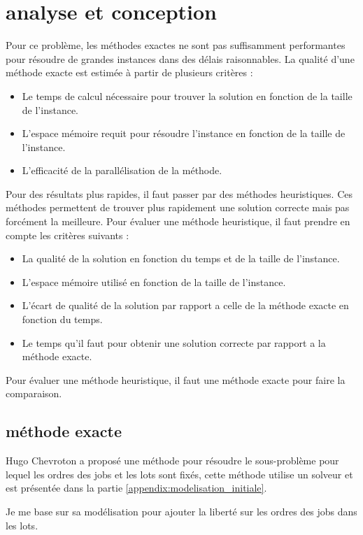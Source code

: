 \chapter{analyse et conception}

Pour ce problème, les méthodes exactes ne sont pas suffisamment performantes pour résoudre de grandes instances dans des délais raisonnables.
La qualité d'une méthode exacte est estimée à partir de plusieurs critères :
\begin{itemize}
	\item Le temps de calcul nécessaire pour trouver la solution en fonction de la taille de l'instance.
	\item L'espace mémoire requit pour résoudre l'instance en fonction de la taille de l'instance.
	\item L'efficacité de la parallélisation de la méthode.
\end{itemize}
Pour des résultats plus rapides, il faut passer par des méthodes heuristiques.
Ces méthodes permettent de trouver plus rapidement une solution correcte mais pas forcément la meilleure.
Pour évaluer une méthode heuristique, il faut prendre en compte les critères suivants :
\begin{itemize}
	\item La qualité de la solution en fonction du temps et de la taille de l'instance.
	\item L'espace mémoire utilisé en fonction de la taille de l'instance.
	\item L'écart de qualité de la solution par rapport a celle de la méthode exacte en fonction du temps.
	\item Le temps qu'il faut pour obtenir une solution correcte par rapport a la méthode exacte.
\end{itemize}
Pour évaluer une méthode heuristique, il faut une méthode exacte pour faire la comparaison.

\section{méthode exacte}
Hugo Chevroton a proposé une méthode pour résoudre le sous-problème pour lequel les ordres des jobs et les lots sont fixés,
cette méthode utilise un solveur et est présentée dans la partie \autoref{appendix:modelisation_initiale}.

Je me base sur sa modélisation pour ajouter la liberté sur les ordres des jobs dans les lots.



